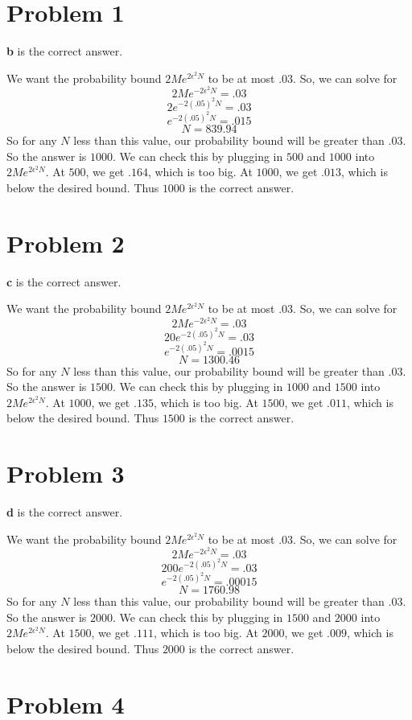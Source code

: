 \documentclass{article}
\begin{document}
\section*{Problem 1}
\textbf{b} is the correct answer.

\noindent We want the probability bound $2Me^{2\epsilon^2N}$ to be at most $.03$.
So, we can solve for
\[ 2Me^{-2\epsilon^2N} = .03 \]
\[ 2e^{-2(.05)^2N} = .03 \]
\[ e^{-2(.05)^2N} = .015 \]
\[ N = 839.94 \]
So for any $N$ less than this value, our probability bound will be greater
than $.03$. So the answer is $1000$. We can check this by plugging in
$500$ and $1000$ into $2Me^{2\epsilon^2N}$. At $500$, we get $.164$, which is
too big. At $1000$, we get $.013$, which is below the desired bound. Thus
$1000$ is the correct answer.
\section*{Problem 2}
\textbf{c} is the correct answer.

\noindent We want the probability bound $2Me^{2\epsilon^2N}$ to be at most $.03$.
So, we can solve for
\[ 2Me^{-2\epsilon^2N} = .03 \]
\[ 20e^{-2(.05)^2N} = .03 \]
\[ e^{-2(.05)^2N} = .0015 \]
\[ N = 1300.46 \]
So for any $N$ less than this value, our probability bound will be greater
than $.03$. So the answer is $1500$. We can check this by plugging in
$1000$ and $1500$ into $2Me^{2\epsilon^2N}$. At $1000$, we get $.135$, which is
too big. At $1500$, we get $.011$, which is below the desired bound. Thus
$1500$ is the correct answer.
\section*{Problem 3}
\textbf{d} is the correct answer.

\noindent We want the probability bound $2Me^{2\epsilon^2N}$ to be at most $.03$.
So, we can solve for
\[ 2Me^{-2\epsilon^2N} = .03 \]
\[ 200e^{-2(.05)^2N} = .03 \]
\[ e^{-2(.05)^2N} = .00015 \]
\[ N = 1760.98 \]
So for any $N$ less than this value, our probability bound will be greater
than $.03$. So the answer is $2000$. We can check this by plugging in
$1500$ and $2000$ into $2Me^{2\epsilon^2N}$. At $1500$, we get $.111$, which is
too big. At $2000$, we get $.009$, which is below the desired bound. Thus
$2000$ is the correct answer.
\section*{Problem 4}
\end{document}
